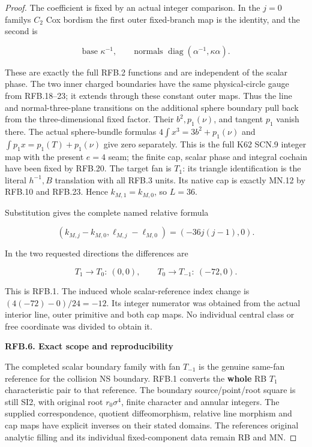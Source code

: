 \begin{proof}
The coefficient is fixed by an actual integer comparison. In the
\(j=0\) family\textquotesingle s \(C_2\) Cox bordism the first outer fixed-branch
map is the identity, and the second is

\[
        \text{base }\kappa^{-1},\qquad
        \text{normals }\operatorname{diag}(\alpha^{-1},\kappa\alpha).
 \tag{RFB.42}
\]

These are exactly the full RFB.2 functions and are independent of
the scalar phase. The two inner charged boundaries have the same
physical-circle gauge from RFB.18--23; it extends through these
constant outer maps. Thus the line and normal-three-plane
transitions on the additional sphere boundary pull back from the
three-dimensional fixed factor. Their \(b^2,p_1(\nu)\), and tangent
\(p_1\) vanish there. The actual sphere-bundle formulas
\(4\int x^3=3b^2+p_1(\nu)\) and
\(\int p_1x=p_1(T)+p_1(\nu)\) give zero separately. This is the
full K62 SCN.9 integer map with the present \(e=4\) seam; the finite
cap, scalar phase and integral cochain have been fixed by RFB.20.
The target fan is \(T_1\): its triangle identification is the
literal \(h^{-1},B\) translation with all RFB.3 units. Its native
cap is exactly MN.12 by RFB.10 and RFB.23. Hence
\(k_{M,1}=k_{M,0}\), so \(L=36\).

Substitution gives the complete named relative formula

\[
 (k_{M,j}-k_{M,0},\ell_{M,j}-\ell_{M,0})
                         =(-36j(j-1),0).
 \tag{RFB.43}
\]

In the two requested directions the differences are

\[
 T_1\longrightarrow T_0:\ (0,0),\qquad
 T_0\longrightarrow T_{-1}:\ (-72,0).
 \tag{RFB.44}
\]

This is RFB.1. The induced whole scalar-reference index change is
\((4(-72)-0)/24=-12\). Its integer numerator was obtained from
the actual interior line, outer primitive and both cap maps. No
individual central class or free coordinate was divided to obtain it.

\par

\medskip\noindent\textbf{RFB.6. Exact scope and reproducibility}

\par\nobreak

The completed scalar boundary family with fan \(T_{-1}\) is the
genuine same-fan reference for the collision NS boundary. RFB.1
converts the \textbf{whole} RB \(T_1\) characteristic pair to that
reference. The boundary source/point/root square is still SI2,
with original root \(r_0\sigma^4\), finite character and annular
integers. The supplied correspondence, quotient diffeomorphism,
relative line morphism and cap maps have explicit inverses on
their stated domains. The reference\textquotesingle s original analytic filling
and its individual fixed-component data remain RB and MN.


\end{proof}
